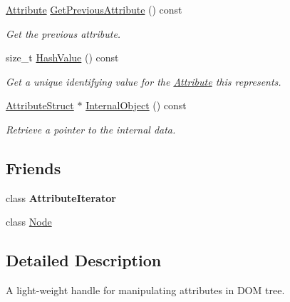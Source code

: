 \begin{DoxyCompactItemize}
\hyperlink{classphys_1_1xml_1_1Attribute}{Attribute} \hyperlink{classphys_1_1xml_1_1Attribute_ae1c2320961faca954e7e34acc166f8d0}{GetPreviousAttribute} () const 
\begin{DoxyCompactList}\small\item\em Get the previous attribute. \item\end{DoxyCompactList}\item 
size\_\-t \hyperlink{classphys_1_1xml_1_1Attribute_ac0c27e07b705c41670a0903f4fe18378}{HashValue} () const 
\begin{DoxyCompactList}\small\item\em Get a unique identifying value for the \hyperlink{classphys_1_1xml_1_1Attribute}{Attribute} this represents. \item\end{DoxyCompactList}\item 
\hyperlink{structphys_1_1xml_1_1AttributeStruct}{AttributeStruct} $\ast$ \hyperlink{classphys_1_1xml_1_1Attribute_a1354d5f93309a999651e11b1cd4c2f62}{InternalObject} () const 
\begin{DoxyCompactList}\small\item\em Retrieve a pointer to the internal data. \item\end{DoxyCompactList}\end{DoxyCompactItemize}
\subsection*{Friends}
\begin{DoxyCompactItemize}
\item 
\hypertarget{classphys_1_1xml_1_1Attribute_a1ed8790083a80b2604beba1c666bce6e}{
class {\bfseries AttributeIterator}}
\label{da/ddf/classphys_1_1xml_1_1Attribute_a1ed8790083a80b2604beba1c666bce6e}

\item 
\hypertarget{classphys_1_1xml_1_1Attribute_a6db9d28bd448a131448276ee03de1e6d}{
class \hyperlink{classphys_1_1xml_1_1Attribute_a6db9d28bd448a131448276ee03de1e6d}{Node}}
\label{da/ddf/classphys_1_1xml_1_1Attribute_a6db9d28bd448a131448276ee03de1e6d}

\end{DoxyCompactItemize}


\subsection{Detailed Description}
A light-\/weight handle for manipulating attributes in DOM tree. 

